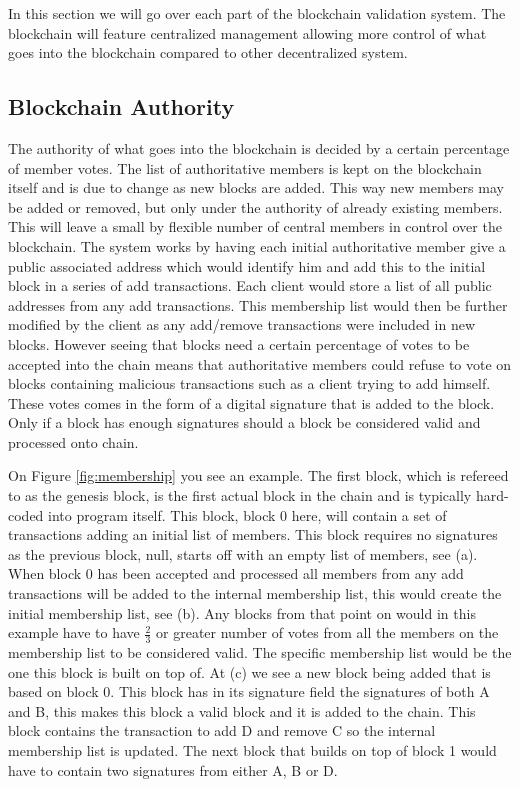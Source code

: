 \documentclass[11pt]{article}
\begin{document}
In this section we will go over each part of the blockchain validation system. The blockchain will feature centralized management allowing more control of what goes into the blockchain compared to other decentralized system.

\subsection{Blockchain Authority}

The authority of what goes into the blockchain is decided by a certain percentage of member votes. The list of authoritative members is kept on the blockchain itself and is due to change as new blocks are added. This way new members may be added or removed, but only under the authority of already existing members. This will leave a small by flexible number of central members in control over the blockchain. The system works by having each initial authoritative member give a public associated address which would identify him and add this to the initial block in a series of add transactions. Each client would store a list of all public addresses from any add transactions. This membership list would then be further modified by the client as any add/remove transactions were included in new blocks. However seeing that blocks need a certain percentage of votes to be accepted into the chain means that authoritative members could refuse to vote on blocks containing malicious transactions such as a client trying to add himself. These votes comes in the form of a digital signature that is added to the block. Only if a block has enough signatures should a block be considered valid and processed onto chain. 


On Figure \ref{fig:membership} you see an example. The first block, which is refereed to as the genesis block, is the first actual block in the chain and is typically hard-coded into program itself. This block, block 0 here, will contain a set of transactions adding an initial list of members. This block requires no signatures as the previous block, null, starts off with an empty list of members, see (a). When block 0 has been accepted and processed all members from any add transactions will be added to the internal membership list, this would create the initial membership list, see (b). Any blocks from that point on would in this example have to have $\frac{2}{3}$ or greater number of votes from all the members on the membership list to be considered valid. The specific membership list would be the one this block is built on top of. At (c) we see a new block being added that is based on block 0. This block has in its signature field the signatures of both A and B, this makes this block a valid block and it is added to the chain. This block contains the transaction to add D and remove C so the internal membership list is updated. The next block that builds on top of block 1 would have to contain two signatures from either A, B or D.
\end{document}
